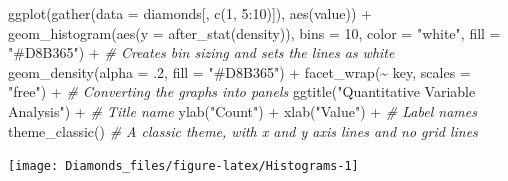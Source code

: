 \documentclass[
]{article}
\newenvironment{Shaded}{\begin{snugshade}}{\end{snugshade}}
\newcommand{\AttributeTok}[1]{\textcolor[rgb]{0.77,0.63,0.00}{#1}}
\newcommand{\CommentTok}[1]{\textcolor[rgb]{0.56,0.35,0.01}{\textit{#1}}}
\newcommand{\DecValTok}[1]{\textcolor[rgb]{0.00,0.00,0.81}{#1}}
\newcommand{\FunctionTok}[1]{\textcolor[rgb]{0.00,0.00,0.00}{#1}}
\newcommand{\NormalTok}[1]{#1}
\newcommand{\SpecialCharTok}[1]{\textcolor[rgb]{0.00,0.00,0.00}{#1}}
\newcommand{\StringTok}[1]{\textcolor[rgb]{0.31,0.60,0.02}{#1}}
\begin{document}
\begin{Shaded}
\begin{Highlighting}[]
\FunctionTok{ggplot}\NormalTok{(}\FunctionTok{gather}\NormalTok{(}\AttributeTok{data =}\NormalTok{ diamonds[, }\FunctionTok{c}\NormalTok{(}\DecValTok{1}\NormalTok{, }\DecValTok{5}\SpecialCharTok{:}\DecValTok{10}\NormalTok{)]), }\FunctionTok{aes}\NormalTok{(value)) }\SpecialCharTok{+}
  \FunctionTok{geom\_histogram}\NormalTok{(}\FunctionTok{aes}\NormalTok{(}\AttributeTok{y =} \FunctionTok{after\_stat}\NormalTok{(density)),}
                 \AttributeTok{bins =} \DecValTok{10}\NormalTok{,}
                 \AttributeTok{color =} \StringTok{"white"}\NormalTok{,}
                 \AttributeTok{fill =} \StringTok{"\#D8B365"}\NormalTok{) }\SpecialCharTok{+} \CommentTok{\# Creates bin sizing and sets the lines as white}
  \FunctionTok{geom\_density}\NormalTok{(}\AttributeTok{alpha =}\NormalTok{ .}\DecValTok{2}\NormalTok{, }\AttributeTok{fill =} \StringTok{"\#D8B365"}\NormalTok{) }\SpecialCharTok{+}
  \FunctionTok{facet\_wrap}\NormalTok{(}\SpecialCharTok{\textasciitilde{}}\NormalTok{ key, }\AttributeTok{scales =} \StringTok{"free"}\NormalTok{) }\SpecialCharTok{+} \CommentTok{\# Converting the graphs into panels}
  \FunctionTok{ggtitle}\NormalTok{(}\StringTok{"Quantitative Variable Analysis"}\NormalTok{) }\SpecialCharTok{+} \CommentTok{\# Title name}
  \FunctionTok{ylab}\NormalTok{(}\StringTok{"Count"}\NormalTok{) }\SpecialCharTok{+} \FunctionTok{xlab}\NormalTok{(}\StringTok{"Value"}\NormalTok{) }\SpecialCharTok{+} \CommentTok{\# Label names}
  \FunctionTok{theme\_classic}\NormalTok{() }\CommentTok{\# A classic theme, with x and y axis lines and no grid lines}
\end{Highlighting}
\end{Shaded}

\begin{center}\texttt{[image: Diamonds\_files/figure-latex/Histograms-1]} \end{center}
\end{document}

